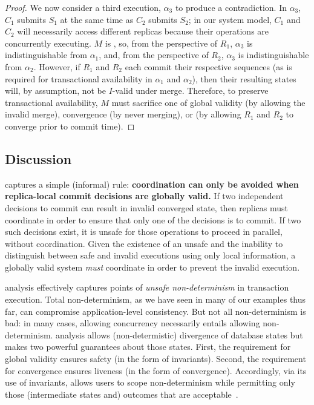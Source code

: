 \begin{proof}
   We now consider a third execution, $\alpha_3$ to produce a
   contradiction. In $\alpha_3$, $C_1$ submits $S_1$ at the same time
   as $C_2$ submits $S_2$; in our system model, $C_1$ and $C_2$ will
   necessarily access different replicas because their operations are
   concurrently executing. $M$ is \cfree, so, from the perspective of
   $R_1$, $\alpha_3$ is indistinguishable from $\alpha_1$, and, from
   the perspective of $R_2$, $\alpha_3$ is indistinguishable from
   $\alpha_2$. However, if $R_1$ and $R_2$ each commit their
   respective sequences (as is required for transactional availability
   in $\alpha_1$ and $\alpha_2$), then their resulting states will, by
   assumption, not be $I$-valid under merge. Therefore, to preserve
   transactional availability, $M$ must sacrifice one of global
   validity (by allowing the invalid merge), convergence (by never
   merging), or \cfreedom (by allowing $R_1$ and $R_2$ to converge
   prior to commit time).
\end{proof}

\subsection{Discussion}

\iconfluence captures a simple (informal) rule: \textbf{coordination
  can only be avoided when replica-local commit decisions are globally
  valid.} If two independent decisions to commit can result in invalid
converged state, then replicas must coordinate in order to ensure that
only one of the decisions is to commit. If two such decisions exist,
it is unsafe for those operations to proceed in parallel, without
coordination. Given the existence of an unsafe and the inability to
distinguish between safe and invalid executions using only local
information, a globally valid system \textit{must} coordinate in order
to prevent the invalid execution.

\iconfluence analysis effectively captures points of \textit{unsafe
  non-determinism} in transaction execution. Total non-determinism, as
we have seen in many of our examples thus far, can compromise
application-level consistency. But not all non-determinism is bad: in
many cases, allowing concurrency necessarily entails allowing
non-determinism. \iconfluence analysis allows (non-determistic)
divergence of database states but makes two powerful guarantees about
those states. First, the requirement for global validity ensures
safety (in the form of invariants). Second, the requirement for
convergence ensures liveness (in the form of
convergence). Accordingly, via its use of invariants, \iconfluence
allows users to scope non-determinism while permitting only those
(intermediate states and) outcomes that are
acceptable~\cite{consistency-borders}.

